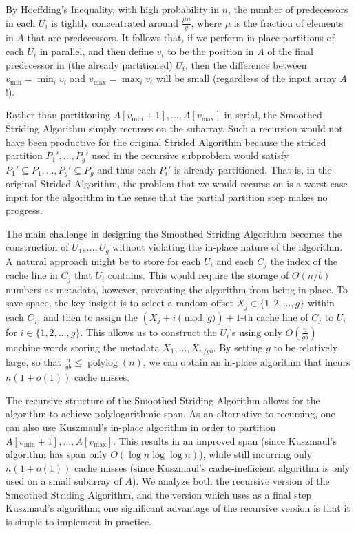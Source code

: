 \documentclass[11pt]{article}
\theoremstyle{remark}
\theoremstyle{remark}
\begin{document}
By Hoeffding's Inequality, with high probability in $n$, the number of
predecessors in each $U_i$ is tightly concentrated around $\frac{\mu
  n}{g}$, where $\mu$ is the fraction of elements in $A$ that are
predecessors. It follows that, if we perform in-place partitions of
each $U_i$ in parallel, and then define $v_i$ to be the position in
$A$ of the final predecessor in (the already partitioned) $U_i$, then
the difference between $v_{\text{min}} = \min_i v_i$ and
$v_{\text{max}} = \max_i v_i$ will be small (regardless of the input array
$A$!).

Rather than partitioning $A[v_{\text{min}}+1],\ldots,
A[v_{\text{max}}]$ in serial, the Smoothed Striding Algorithm simply
recurses on the subarray. Such a recursion would not have been
productive for the original Strided Algorithm because the strided
partition $P_1', \ldots, P_g'$ used in the recursive subproblem would
satisfy $P_1' \subseteq P_1, \ldots, P_g' \subseteq P_g$ and thus each
$P_i'$ is already partitioned. That is, in the original Strided
Algorithm, the problem that we would recurse on is a worst-case input
for the algorithm in the sense that the partial partition step makes
no progress.


The main challenge in designing the Smoothed Striding Algorithm
becomes the construction of $U_1, \ldots, U_{g}$ without
violating the in-place nature of the algorithm. A natural approach
might be to store for each $U_i$ and each $C_j$ the index of the cache
line in $C_j$ that $U_i$ contains. This would require the storage of
$\Theta(n / b)$ numbers as metadata, however, preventing the algorithm
from being in-place. To save space, the key insight is to select a
random offset $X_j \in \{1, 2, \ldots, g\}$ within each $C_j$, and
then to assign the $(X_j + i \pmod g) + 1$-th cache line of $C_j$ to
$U_i$ for $i \in \{1, 2, \ldots, g\}$. This allows us to construct
the $U_i$'s using only $O\left(\frac{n}{gb}\right)$ machine words
storing the metadata $X_1, \ldots, X_{n / gb}$. By setting $g$ to
be relatively large, so that $\frac{n}{gb} \le
\operatorname{polylog}(n)$, we can obtain an in-place algorithm that
incurs $n (1 + o(1))$ cache misses.

The recursive structure of the Smoothed Striding Algorithm allows for the
algorithm to achieve polylogarithmic span. As an alternative to recursing, one
can also use Kuszmaul's in-place algorithm \cite{Kuszmaul19} in order to
partition $A[v_{\text{min}}+1], \ldots, A[v_{\text{max}}]$. This results
in an improved span (since Kuszmaul's algorithm has span
only $O(\log n \log \log n)$), while still incurring only $n (1 + o(1))$ cache
misses (since Kuszmaul's cache-inefficient algorithm is only
used on a small subarray of $A$). We analyze both the recursive version of the
Smoothed Striding Algorithm, and the version which uses as a final step
Kuszmaul's algorithm; one significant advantage of the recursive
version is that it is simple to implement in practice.
\end{document}
